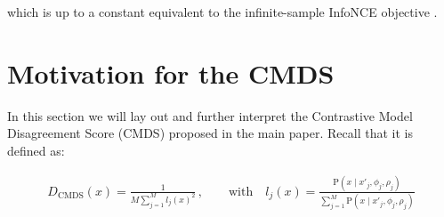 \documentclass[tablecaption=bottom,wcp]{jmlr} %
\begin{document}
which is up to a constant equivalent to the infinite-sample InfoNCE objective \citep{wang2020understanding,li2021self}.








\section{Motivation for the CMDS}\label{apd:Dis Score}

In this section we will lay out and further interpret the Contrastive Model Disagreement Score (CMDS) proposed in the main paper. Recall that it is defined as: 

%
 \begin{align}
D_{\text{CMDS}}\left(x\right)=\frac{1}{M \sum_{j=1}^{M} l_{j}(x)^2} \, , \qquad \text{with} \quad l_{j}(x)=\frac{\mathrm{P}\left(x \mid x'_{j}, \phi_{j}, \rho_{j} \right)}{\sum_{j=1}^{M} \mathrm{P}\left(x \mid x'_{j}, \phi_{j}, \rho_{j} \right)}
\end{align}
%
\end{document}
